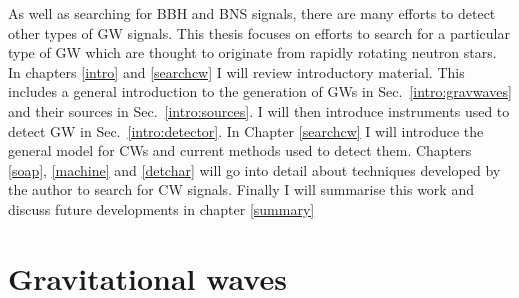 As well as searching for \gls{BBH} and \gls{BNS} signals, there are many
efforts to detect other types of \gls{GW} signals.  This thesis focuses on
efforts to search for a particular type of \gls{GW} which are thought to
originate from rapidly rotating neutron stars.  In chapters \ref{intro} and
\ref{searchcw} I will review introductory material.  This includes a general
introduction to the generation of \glspl{GW} in Sec.~\ref{intro:gravwaves} and
their sources in Sec.~\ref{intro:sources}.  I will then introduce instruments
used to detect \gls{GW} in Sec.~\ref{intro:detector}.  In Chapter
\ref{searchcw} I will introduce the general model for \glspl{CW} and current
methods used to detect them.  Chapters \ref{soap}, \ref{machine} and
\ref{detchar} will go into detail about techniques developed by the author to
search for \gls{CW} signals.  Finally I will summarise this work and discuss
future developments in chapter \ref{summary}
~

\section{\label{intro:gravwaves}Gravitational waves}

